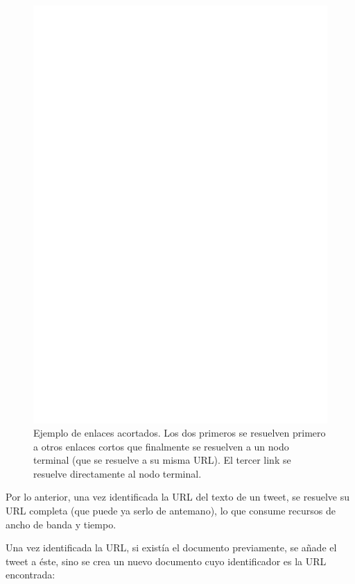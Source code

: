   \begin{figure}[h]
  \centering
  \includegraphics[width=16cm]{./dia/shortlinks.ps}
  \caption[Ejemplo de enlaces acortados.]
   {Ejemplo de enlaces acortados. Los dos primeros se resuelven
  primero a otros enlaces cortos que finalmente se resuelven a un
  nodo terminal (que se resuelve a su misma URL). El tercer link se
  resuelve directamente al nodo terminal.\label{fig:short}}
  \end{figure}

    Por lo anterior, una vez identificada la URL del texto de un
    tweet, se resuelve su URL completa (que puede ya serlo de
    antemano), lo que consume recursos de ancho de banda y
    tiempo.

    Una vez identificada la URL, si existía el documento previamente,
    se añade el tweet a éste, sino se crea un nuevo documento cuyo
    identificador es la URL encontrada:

